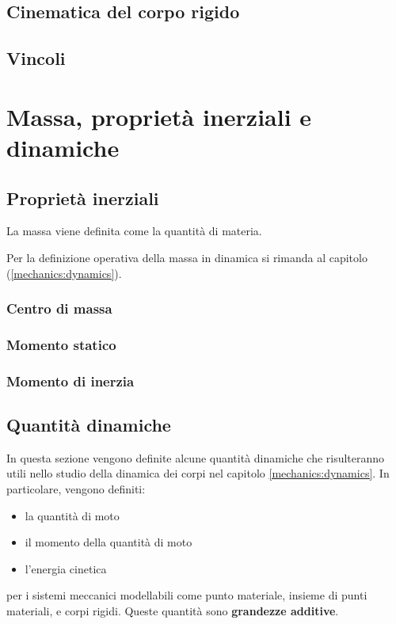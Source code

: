 \section{Cinematica del corpo rigido}

\section{Vincoli}\label{mechanics:kinematics:constraints}

\chapter{Massa, proprietà inerziali e dinamiche}

\section{Proprietà inerziali}

\begin{definition}[Massa] La massa viene definita come la quantità di materia.
\end{definition}
{\color{red} Per la definizione operativa della massa in dinamica si rimanda al capitolo (\ref{mechanics:dynamics}).}

\subsection{Centro di massa}
\subsection{Momento statico}
\subsection{Momento di inerzia}

\section{Quantità dinamiche}
In questa sezione vengono definite alcune quantità dinamiche che risulteranno utili nello studio della dinamica dei corpi nel capitolo \ref{mechanics:dynamics}. In particolare, vengono definiti:
\begin{itemize}
  \item la quantità di moto
  \item il momento della quantità di moto
  \item l'energia cinetica
\end{itemize}
per i sistemi meccanici modellabili come punto materiale, insieme di punti materiali, e corpi rigidi.
Queste quantità sono \textbf{grandezze additive}.

